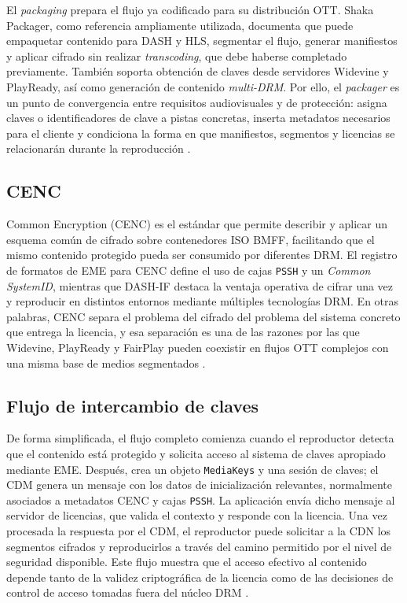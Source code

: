 El \textit{packaging} prepara el flujo ya codificado para su distribución OTT. Shaka Packager, como referencia ampliamente utilizada, documenta que puede empaquetar contenido para DASH y HLS, segmentar el flujo, generar manifiestos y aplicar cifrado sin realizar \textit{transcoding}, que debe haberse completado previamente. También soporta obtención de claves desde servidores Widevine y PlayReady, así como generación de contenido \textit{multi-DRM}. Por ello, el \textit{packager} es un punto de convergencia entre requisitos audiovisuales y de protección: asigna claves o identificadores de clave a pistas concretas, inserta metadatos necesarios para el cliente y condiciona la forma en que manifiestos, segmentos y licencias se relacionarán durante la reproducción \cite{shaka-packager-docs,shaka-packager-drm}.

\subsection{CENC}

Common Encryption (CENC) es el estándar que permite describir y aplicar un esquema común de cifrado sobre contenedores ISO BMFF, facilitando que el mismo contenido protegido pueda ser consumido por diferentes DRM. El registro de formatos de EME para CENC define el uso de cajas \nolinkurl{PSSH} y un \textit{Common SystemID}, mientras que DASH-IF destaca la ventaja operativa de cifrar una vez y reproducir en distintos entornos mediante múltiples tecnologías DRM. En otras palabras, CENC separa el problema del cifrado del problema del sistema concreto que entrega la licencia, y esa separación es una de las razones por las que Widevine, PlayReady y FairPlay pueden coexistir en flujos OTT complejos con una misma base de medios segmentados \cite{w3c-cenc-initdata,dashif-about,widevine2024}.

\subsection{Flujo de intercambio de claves}

De forma simplificada, el flujo completo comienza cuando el reproductor detecta que el contenido está protegido y solicita acceso al sistema de claves apropiado mediante EME. Después, crea un objeto \nolinkurl{MediaKeys} y una sesión de claves; el CDM genera un mensaje con los datos de inicialización relevantes, normalmente asociados a metadatos CENC y cajas \nolinkurl{PSSH}. La aplicación envía dicho mensaje al servidor de licencias, que valida el contexto y responde con la licencia. Una vez procesada la respuesta por el CDM, el reproductor puede solicitar a la CDN los segmentos cifrados y reproducirlos a través del camino permitido por el nivel de seguridad disponible. Este flujo muestra que el acceso efectivo al contenido depende tanto de la validez criptográfica de la licencia como de las decisiones de control de acceso tomadas fuera del núcleo DRM \cite{w3ceme2026,w3c-cenc-initdata,patat2022,widevine2024}.

